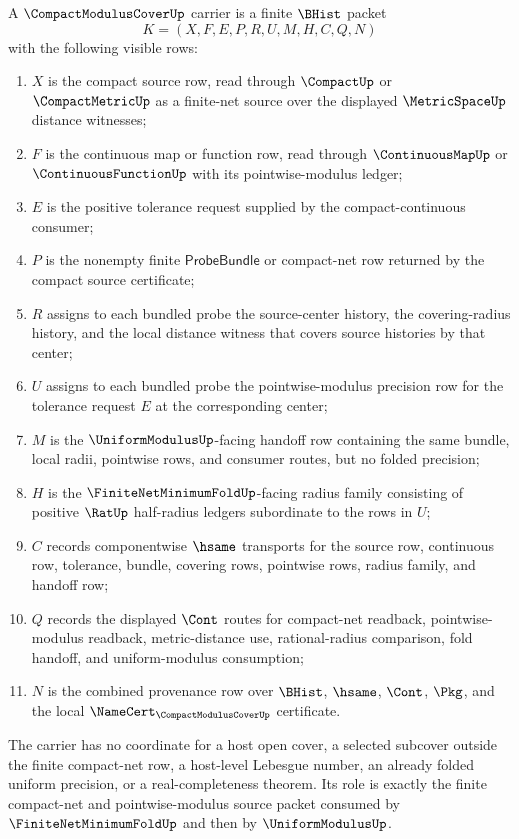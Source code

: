 \begin{definition}
\label{def:compact-modulus-cover-carrier}
A $\CompactModulusCoverUp$ carrier is a finite $\BHist$ packet
$$
K=(X,F,E,P,R,U,M,H,C,Q,N)
$$
with the following visible rows:
\begin{enumerate}
\item $X$ is the compact source row, read through $\CompactUp$ or $\CompactMetricUp$ as a finite-net source over the displayed $\MetricSpaceUp$ distance witnesses;
\item $F$ is the continuous map or function row, read through $\ContinuousMapUp$ or $\ContinuousFunctionUp$ with its pointwise-modulus ledger;
\item $E$ is the positive tolerance request supplied by the compact-continuous consumer;
\item $P$ is the nonempty finite $\mathsf{ProbeBundle}$ or compact-net row returned by the compact source certificate;
\item $R$ assigns to each bundled probe the source-center history, the covering-radius history, and the local distance witness that covers source histories by that center;
\item $U$ assigns to each bundled probe the pointwise-modulus precision row for the tolerance request $E$ at the corresponding center;
\item $M$ is the $\UniformModulusUp$-facing handoff row containing the same bundle, local radii, pointwise rows, and consumer routes, but no folded precision;
\item $H$ is the $\FiniteNetMinimumFoldUp$-facing radius family consisting of positive $\RatUp$ half-radius ledgers subordinate to the rows in $U$;
\item $C$ records componentwise $\hsame$ transports for the source row, continuous row, tolerance, bundle, covering rows, pointwise rows, radius family, and handoff row;
\item $Q$ records the displayed $\Cont$ routes for compact-net readback, pointwise-modulus readback, metric-distance use, rational-radius comparison, fold handoff, and uniform-modulus consumption;
\item $N$ is the combined provenance row over $\BHist$, $\hsame$, $\Cont$, $\Pkg$, and the local $\NameCert_{\CompactModulusCoverUp}$ certificate.
\end{enumerate}
The carrier has no coordinate for a host open cover, a selected subcover outside the finite compact-net row, a host-level Lebesgue number, an already folded uniform precision, or a real-completeness theorem. Its role is exactly the finite compact-net and pointwise-modulus source packet consumed by $\FiniteNetMinimumFoldUp$ and then by $\UniformModulusUp$.
\end{definition}

